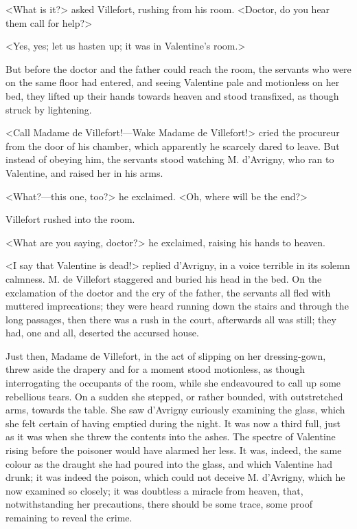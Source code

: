  <What is it?> asked Villefort, rushing from his room. <Doctor, do you hear them call for help?> 

 <Yes, yes; let us hasten up; it was in Valentine's room.> 

 But before the doctor and the father could reach the room, the servants who were on the same floor had entered, and seeing Valentine pale and motionless on her bed, they lifted up their hands towards heaven and stood transfixed, as though struck by lightening. 

 <Call Madame de Villefort!—Wake Madame de Villefort!> cried the procureur from the door of his chamber, which apparently he scarcely dared to leave. But instead of obeying him, the servants stood watching M. d'Avrigny, who ran to Valentine, and raised her in his arms. 

 <What?—this one, too?> he exclaimed. <Oh, where will be the end?> 

 Villefort rushed into the room. 

 <What are you saying, doctor?> he exclaimed, raising his hands to heaven. 

 <I say that Valentine is dead!> replied d'Avrigny, in a voice terrible in its solemn calmness.  M. de Villefort staggered and buried his head in the bed. On the exclamation of the doctor and the cry of the father, the servants all fled with muttered imprecations; they were heard running down the stairs and through the long passages, then there was a rush in the court, afterwards all was still; they had, one and all, deserted the accursed house. 

 Just then, Madame de Villefort, in the act of slipping on her dressing-gown, threw aside the drapery and for a moment stood motionless, as though interrogating the occupants of the room, while she endeavoured to call up some rebellious tears. On a sudden she stepped, or rather bounded, with outstretched arms, towards the table. She saw d'Avrigny curiously examining the glass, which she felt certain of having emptied during the night. It was now a third full, just as it was when she threw the contents into the ashes. The spectre of Valentine rising before the poisoner would have alarmed her less. It was, indeed, the same colour as the draught she had poured into the glass, and which Valentine had drunk; it was indeed the poison, which could not deceive M. d'Avrigny, which he now examined so closely; it was doubtless a miracle from heaven, that, notwithstanding her precautions, there should be some trace, some proof remaining to reveal the crime. 

